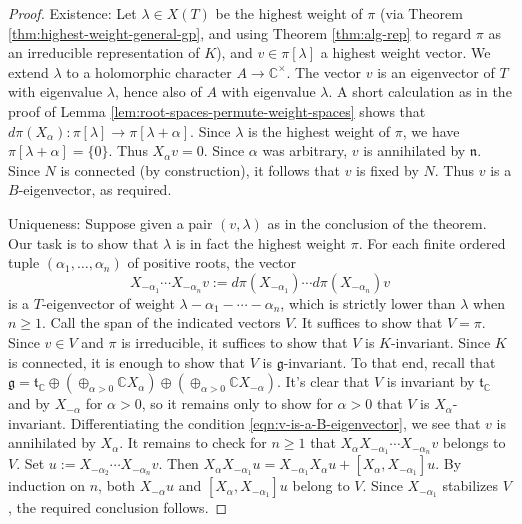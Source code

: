\documentclass[reqno]{amsart} 
\begin{document}
\begin{proof}
  Existence: Let $\lambda \in X(T)$ be the highest weight of $\pi$ (via Theorem \ref{thm:highest-weight-general-gp}, and using Theorem \ref{thm:alg-rep} to regard $\pi$ as an irreducible representation of $K$), and $v \in \pi[\lambda]$ a highest weight vector.  We extend $\lambda$ to a holomorphic character $A \rightarrow \mathbb{C}^\times$.  The vector $v$ is an eigenvector of $T$ with eigenvalue $\lambda$, hence also of $A$ with eigenvalue $\lambda$.  A short calculation as in the proof of Lemma \ref{lem:root-spaces-permute-weight-spaces} shows that $d \pi(X_\alpha) : \pi[\lambda] \rightarrow \pi[\lambda+\alpha]$.  Since $\lambda$ is the highest weight of $\pi$, we have $\pi[\lambda+\alpha] = \{0\}$.  Thus $X_\alpha v = 0$.  Since $\alpha$ was arbitrary, $v$ is annihilated by $\mathfrak{n}$.  Since $N$ is connected (by construction), it follows that $v$ is fixed by $N$.  Thus $v$ is a $B$-eigenvector, as required.

  Uniqueness: Suppose given a pair $(v,\lambda)$ as in the conclusion of the theorem.  Our task is to show that $\lambda$ is in fact the highest weight $\pi$.  For each finite ordered tuple $(\alpha_1,\dotsc,\alpha_n)$ of positive roots, the vector
  \begin{equation*}
    X_{-\alpha_1} \dotsb X_{-\alpha_n} v
    :=
    d \pi(X_{-\alpha_1}) \dotsb d \pi(X_{-\alpha_n}) v
  \end{equation*}
  is a $T$-eigenvector of weight $\lambda - \alpha_1 - \dotsb - \alpha_n$, which is strictly lower than $\lambda$ when $n \geq 1$.  Call the span of the indicated vectors $V$.  It suffices to show that $V = \pi$.  Since $v \in V$ and $\pi$ is irreducible, it suffices to show that $V$ is $K$-invariant.  Since $K$ is connected, it is enough to show that $V$ is $\mathfrak{g}$-invariant.  To that end, recall that $\mathfrak{g} = \mathfrak{t}_{\mathbb{C}} \oplus (\oplus_{\alpha >0} \mathbb{C} X_\alpha) \oplus (\oplus_{\alpha > 0} \mathbb{C} X_{-\alpha})$.  It's clear that $V$ is invariant by $\mathfrak{t}_{\mathbb{C}}$ and by $X_{-\alpha}$ for $\alpha > 0$, so it remains only to show for $\alpha > 0$ that $V$ is $X_{\alpha}$-invariant.  Differentiating the condition \eqref{eqn:v-is-a-B-eigenvector}, we see that $v$ is annihilated by $X_{\alpha}$.  It remains to check for $n \geq 1$ that $X_{\alpha} X_{-\alpha_1} \dotsb X_{-\alpha_n} v$ belongs to $V$.  Set $u := X_{-\alpha_2} \dotsb X_{-\alpha_n} v$.  Then $X_{\alpha} X_{-\alpha_1} u = X_{-\alpha_1} X_\alpha u + [X_{\alpha}, X_{-\alpha_1}] u$.  By induction on $n$, both $X_{-\alpha} u$ and $[X_{\alpha}, X_{-\alpha_1}] u$ belong to $V$.  Since $X_{-\alpha_1}$ stabilizes $V$, the required conclusion follows.
  

\end{proof}
\end{document}
